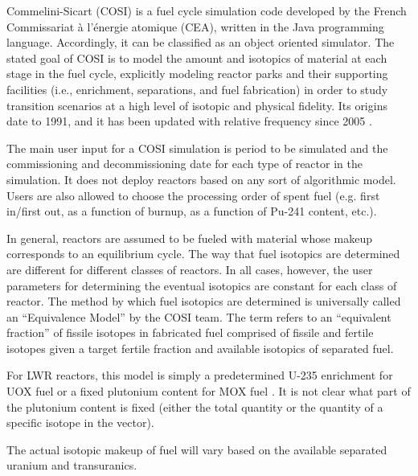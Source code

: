 Commelini-Sicart (COSI) is a fuel cycle simulation code developed by the French
Commissariat \`{a} l'\'{e}nergie atomique (CEA), written in the Java programming
language. Accordingly, it can be classified as an object oriented simulator. The
stated goal of COSI is to model the amount and isotopics of material at each
stage in the fuel cycle, explicitly modeling reactor parks and their supporting
facilities (i.e., enrichment, separations, and fuel fabrication) in order to
study transition scenarios at a high level of isotopic and physical
fidelity. Its origins date to 1991, and it has been updated with relative
frequency since 2005 \cite{boucher_cosi_2005,boucher_cosi:_2006,meyer_new_2009,
coquelet-pascal_validation_2011}.

The main user input for a COSI simulation is period to be simulated and the
commissioning and decommissioning date for each type of reactor in the
simulation. It does not deploy reactors based on any sort of algorithmic
model. Users are also allowed to choose the processing order of spent fuel
(e.g. first in/first out, as a function of burnup, as a function of Pu-241
content, etc.).

In general, reactors are assumed to be fueled with material whose makeup
corresponds to an equilibrium cycle. The way that fuel isotopics are determined
are different for different classes of reactors. In all cases, however, the user
parameters for determining the eventual isotopics are constant for each class of
reactor\cite{coquelet-pascal_validation_2011}. The method by which fuel
isotopics are determined is universally called an ``Equivalence Model'' by the
COSI team. The term refers to an ``equivalent fraction'' of fissile isotopes in
fabricated fuel comprised of fissile and fertile isotopes given a target fertile
fraction and available isotopics of separated fuel. 

For LWR reactors, this model is simply a predetermined U-235 enrichment for UOX
fuel or a fixed plutonium content for MOX
fuel \cite{coquelet-pascal_validation_2011}. It is not clear what part of the
plutonium content is fixed (either the total quantity or the quantity of a
specific isotope in the vector).



The actual isotopic makeup of fuel will vary based on the available
separated uranium and transuranics.

